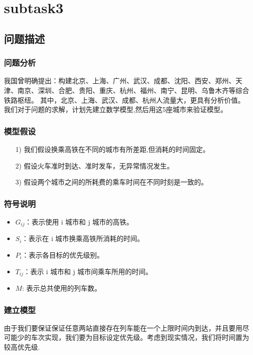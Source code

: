 \documentclass[12pt, a4paper, oneside]{ctexart}
\begin{document}
\section{subtask3}

\subsection{问题描述} 
\subsubsection{问题分析}
我国曾明确提出：构建北京、上海、广州、武汉、成都、沈阳、西安、郑州、天津、南京、深圳、合肥、贵阳、重庆、杭州、福州、南宁、昆明、乌鲁木齐等综合铁路枢纽。
其中，北京、上海、武汉、成都、杭州人流量大，更具有分析价值。
我们对于问题的求解，计划先建立数学模型,然后用这5座城市来验证模型。

\subsubsection{模型假设}

\begin{itemize}
    \item [1)] 
    我们假设换乘高铁在不同的城市有所差距,但消耗的时间固定。 
    \item [2)]
    假设火车准时到达、准时发车，无异常情况发生。
    \item [3)]
    假设两个城市之间的所耗费的乘车时间在不同时刻是一致的。
\end{itemize}

\subsubsection{符号说明}
\begin{itemize}
    \item $G_{ij}$：表示使用 i 城市和 j 城市的高铁。
    \item $S_i$：表示在 i 城市换乘高铁所消耗的时间。
    \item $P_i$：表示各目标的优先级别。
    \item $T_{ij}$：表示 i 城市和 j 城市间乘车所用的时间。
    \item $M$: 表示总共使用的列车数。
\end{itemize}

\subsubsection{建立模型}
由于我们要保证保证任意两站直接存在列车能在一个上限时间内到达，并且要用尽可能少的车次实现，我们要为目标设定优先级。考虑到现实情况，我们将时间置为较高优先级.
\end{document}
